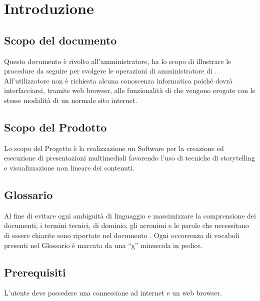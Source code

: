 \section{Introduzione}
\subsection{Scopo del documento}
Questo documento è rivolto all’amministratore, ha lo scopo di illustrare le procedure da seguire per svolgere le operazioni di amministratore di \premi . All’utilizzatore non è richiesta alcuna conoscenza informatica poiché dovrà interfacciarsi, tramite web browser, alle funzionalità di \premi che vengono erogate con le stesse modalità di un normale sito internet.
\subsection{Scopo del Prodotto}
Lo scopo del Progetto è la realizzazione un Software per la creazione ed esecuzione di presentazioni multimediali favorendo l’uso di tecniche di storytelling e visualizzazione non lineare dei contenuti.
\subsection{Glossario}
Al fine di evitare ogni ambiguità di linguaggio e massimizzare la comprensione dei documenti, i termini tecnici, di dominio, gli acronimi e le parole che necessitano di essere chiarite sono riportate nel documento \href{run:../../Esterni/\fGlossario}{\fEscapeGlossario}. Ogni occorrenza di vocaboli presenti nel Glossario è marcata da una “g” minuscola in pedice.
\subsection{Prerequisiti}
L’utente deve possedere una connessione ad internet e un web browser.

